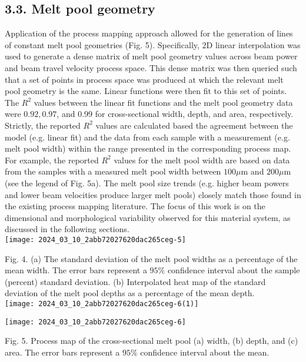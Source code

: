 \documentclass[10pt]{article}
\begin{document}
\subsection*{3.3. Melt pool geometry}
Application of the process mapping approach allowed for the generation of lines of constant melt pool geometries (Fig. 5). Specifically, $2 \mathrm{D}$ linear interpolation was used to generate a dense matrix of melt pool geometry values across beam power and beam travel velocity process space. This dense matrix was then queried such that a set of points in process space was produced at which the relevant melt pool geometry is the same. Linear functions were then fit to this set of points. The $R^{2}$ values between the linear fit functions and the melt pool geometry data were $0.92,0.97$, and 0.99 for cross-sectional width, depth, and area, respectively. Strictly, the reported $R^{2}$ values are calculated based the agreement between the model (e.g. linear fit) and the data from each sample with a measurement (e.g. melt pool width) within the range presented in the corresponding process map. For example, the reported $R^{2}$ values for the melt pool width are based on data from the samples with a measured melt pool width between $100 \mu \mathrm{m}$ and $200 \mu \mathrm{m}$ (see the legend of Fig. 5a). The melt pool size trends (e.g. higher beam powers and lower beam velocities produce larger melt pools) closely match those found in the existing process mapping literature. The focus of this work is on the dimensional and morphological variability observed for this material system, as discussed in the following sections.\\
\texttt{[image: 2024\_03\_10\_2abb72027620dac265ceg-5]}

Fig. 4. (a) The standard deviation of the melt pool widths as a percentage of the mean width. The error bars represent a $95 \%$ confidence interval about the sample (percent) standard deviation. (b) Interpolated heat map of the standard deviation of the melt pool depths as a percentage of the mean depth.\\
\texttt{[image: 2024\_03\_10\_2abb72027620dac265ceg-6(1)]}

\begin{center}
\texttt{[image: 2024\_03\_10\_2abb72027620dac265ceg-6]}
\end{center}

Fig. 5. Process map of the cross-sectional melt pool (a) width, (b) depth, and (c) area. The error bars represent a $95 \%$ confidence interval about the mean.
\end{document}
